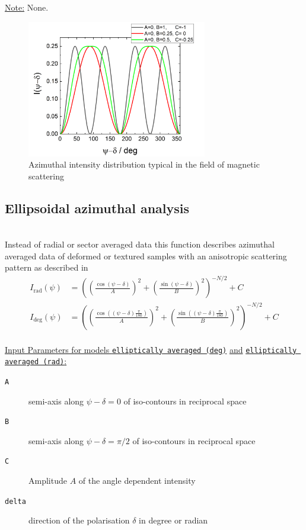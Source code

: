 \noindent \underline{Note:}
None.


\begin{figure}[htb]
\begin{center}
\includegraphics[width=0.7\textwidth]{../images/form_factor/azimuthal/sin2sin4.png}
\end{center}
\caption{Azimuthal intensity distribution typical in the field of magnetic scattering}
\label{fig:IQsin2sin4}
\end{figure}

\newpage
\subsection{Ellipsoidal azimuthal analysis} ~\\
Instead of radial or sector averaged data this function describes azimuthal averaged data of deformed or textured samples with an anisotropic scattering pattern as described in
\cite{Summerfield1983,Mildner1983,Reynolds1984,Hammouda1986,Hammouda1986a,Saraf1989,Svetogorsky1990,Gu2016,Gu2018}
\begin{align}
I_\mathrm{rad}(\psi) &= \left(\left(\frac{\cos(\psi-\delta)}{A}\right)^2 + \left(\frac{\sin(\psi-\delta)}{B}\right)^2\right)^{-N/2} +C\\
I_\mathrm{deg}(\psi) &= \left(\left(\frac{\cos\left((\psi-\delta)\frac{\pi}{180}\right)}{A}\right)^2 + \left(\frac{\sin\left((\psi-\delta)\frac{\pi}{180}\right)}{B}\right)^2\right)^{-N/2}+C
\end{align}
\hspace{1pt}\\
\underline{Input Parameters for models \texttt{elliptically averaged (deg)}} \underline{and} \underline{\texttt{elliptically averaged (rad)}:}\\
\begin{description}
\item[\texttt{A}] semi-axis along $\psi-\delta=0$ of iso-contours in reciprocal space
\item[\texttt{B}] semi-axis along $\psi-\delta=\pi/2$ of iso-contours in reciprocal space
\item[\texttt{C}] Amplitude $A$ of the angle dependent intensity
\item[\texttt{delta}] direction of the polarisation $\delta$ in degree or radian
\end{description}

